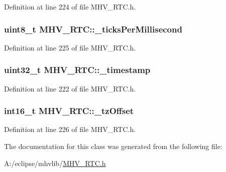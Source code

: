 \-Definition at line 224 of file \-M\-H\-V\-\_\-\-R\-T\-C.\-h.

\hypertarget{class_m_h_v___r_t_c_a48e7d03e90e78881ed8833d6e4f77b36}{
\subsubsection[{\-\_\-ticks\-Per\-Millisecond}]{\setlength{\rightskip}{0pt plus 5cm}uint8\-\_\-t {\bf \-M\-H\-V\-\_\-\-R\-T\-C\-::\-\_\-ticks\-Per\-Millisecond}}}
\label{class_m_h_v___r_t_c_a48e7d03e90e78881ed8833d6e4f77b36}


\-Definition at line 225 of file \-M\-H\-V\-\_\-\-R\-T\-C.\-h.

\hypertarget{class_m_h_v___r_t_c_a6ac0d6f1b8985cd6113249693da50104}{
\subsubsection[{\-\_\-timestamp}]{\setlength{\rightskip}{0pt plus 5cm}uint32\-\_\-t {\bf \-M\-H\-V\-\_\-\-R\-T\-C\-::\-\_\-timestamp}}}
\label{class_m_h_v___r_t_c_a6ac0d6f1b8985cd6113249693da50104}


\-Definition at line 222 of file \-M\-H\-V\-\_\-\-R\-T\-C.\-h.

\hypertarget{class_m_h_v___r_t_c_af9e544307713892ec196261247213490}{
\subsubsection[{\-\_\-tz\-Offset}]{\setlength{\rightskip}{0pt plus 5cm}int16\-\_\-t {\bf \-M\-H\-V\-\_\-\-R\-T\-C\-::\-\_\-tz\-Offset}}}
\label{class_m_h_v___r_t_c_af9e544307713892ec196261247213490}


\-Definition at line 226 of file \-M\-H\-V\-\_\-\-R\-T\-C.\-h.



\-The documentation for this class was generated from the following file\-:\begin{DoxyCompactItemize}
\item 
\-A\-:/eclipse/mhvlib/\hyperlink{_m_h_v___r_t_c_8h}{\-M\-H\-V\-\_\-\-R\-T\-C.\-h}\end{DoxyCompactItemize}
